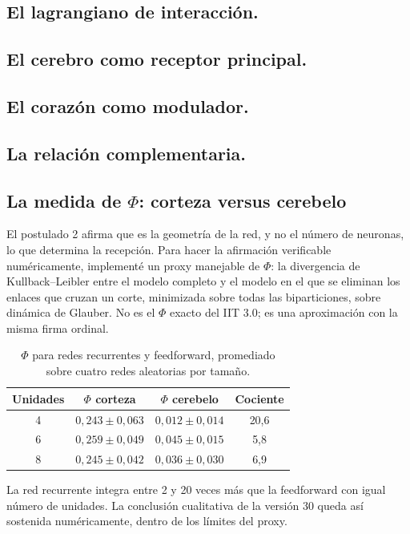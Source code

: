 \subsection{El lagrangiano de interacción.}
\subsection{El cerebro como receptor principal.}
\subsection{El corazón como modulador.}
\subsection{La relación complementaria.}

\subsection{La medida de \texorpdfstring{$\Phi$}{Phi}: corteza versus cerebelo}
El postulado 2 afirma que es la geometría de la red, y no el número de neuronas, lo que determina la recepción. Para hacer la afirmación verificable numéricamente, implementé un proxy manejable de $\Phi$: la divergencia de Kullback--Leibler entre el modelo completo y el modelo en el que se eliminan los enlaces que cruzan un corte, minimizada sobre todas las biparticiones, sobre dinámica de Glauber. No es el $\Phi$ exacto del IIT 3.0; es una aproximación con la misma firma ordinal.

\begin{table}[H]
\centering
\begin{tabular}{@{}cccc@{}}
\toprule
Unidades & $\Phi$ corteza & $\Phi$ cerebelo & Cociente \\ \midrule
4 & $0,243 \pm 0,063$ & $0,012 \pm 0,014$ & 20,6 \\
6 & $0,259 \pm 0,049$ & $0,045 \pm 0,015$ & 5,8 \\
8 & $0,245 \pm 0,042$ & $0,036 \pm 0,030$ & 6,9 \\ \bottomrule
\end{tabular}
\caption{$\Phi$ para redes recurrentes y feedforward, promediado sobre cuatro redes aleatorias por tamaño.}
\label{tab:phi}
\end{table}

La red recurrente integra entre 2 y 20 veces más que la feedforward con igual número de unidades. La conclusión cualitativa de la versión 30 queda así sostenida numéricamente, dentro de los límites del proxy.


